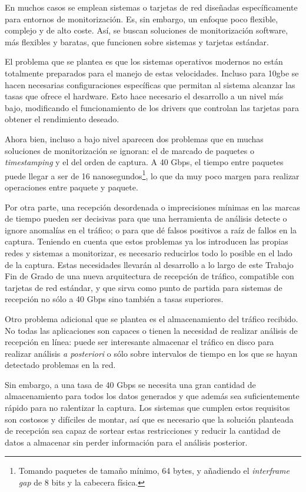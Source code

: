 \documentclass[twoside, 12pt, draft]{epstfg}
\begin{document}
En muchos casos se emplean sistemas o tarjetas de red diseñadas específicamente para entornos de monitorización. Es, sin embargo, un enfoque poco flexible, complejo y de alto coste. Así,  se buscan soluciones de monitorización software, más flexibles y baratas, que funcionen sobre sistemas y tarjetas estándar.

El problema que se plantea es que los sistemas operativos modernos no están totalmente preparados para el manejo de estas velocidades. Incluso para \gls{10gbe} se hacen necesarias configuraciones específicas \cite{leitao2009tuning} que permitan al sistema alcanzar las tasas que ofrece el hardware. Esto hace necesario el desarrollo a un nivel más bajo, modificando el funcionamiento de los \glspl{driver} que controlan las tarjetas para obtener el rendimiento deseado.

Ahora bien, incluso a bajo nivel aparecen dos problemas que en muchas soluciones de monitorización se ignoran:  el de marcado de paquetes o \textit{timestamping} y el del orden de captura. A 40 Gbps, el tiempo entre paquetes puede llegar a ser de 16 nanosegundos\footnote{Tomando paquetes de tamaño mínimo, 64 bytes, y añadiendo el \textit{interframe gap} de 8 bits y la cabecera física.}, lo que da muy poco margen para realizar operaciones entre paquete y paquete.

Por otra parte, una recepción desordenada o imprecisiones mínimas en las marcas de tiempo pueden ser decisivas para que una herramienta de análisis detecte o ignore anomalías en el tráfico; o para que dé falsos positivos a raíz de fallos en la captura. Teniendo en cuenta que estos problemas ya los introducen las propias redes y sistemas a monitorizar, es necesario reducirlos todo lo posible en el lado de la captura. Estas necesidades llevarán al desarrollo a lo largo de este Trabajo Fin de Grado de una nueva arquitectura de recepción de tráfico, compatible con tarjetas de red estándar, y que sirva como punto de partida para sistemas de recepción no sólo a 40 Gbps sino también a tasas superiores.

Otro problema adicional que se plantea es el almacenamiento del tráfico recibido. No todas las aplicaciones son capaces o tienen la necesidad de realizar análisis de recepción en línea: puede ser interesante almacenar el tráfico en disco para realizar análisis \textit{a posteriori} o sólo sobre intervalos de tiempo en los que se hayan detectado problemas en la red.

Sin embargo, a una tasa de 40 Gbps se necesita una gran cantidad de almacenamiento para todos los datos generados y que además sea suficientemente rápido para no ralentizar la captura. Los sistemas que cumplen estos requisitos son costosos y difíciles de montar, así que es necesario que la solución planteada de recepción sea capaz de sortear estas restricciones y reducir la cantidad de datos a almacenar sin perder información para el análisis posterior.
\end{document}
